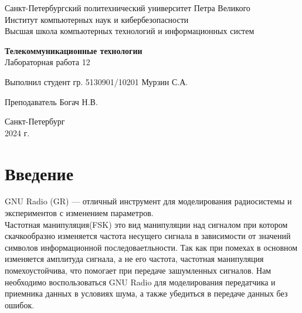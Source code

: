 \documentclass{article}
\begin{document}
\thispagestyle{empty} 
\vspace*{-3cm}
\begin{center}
    Санкт-Петербургский политехнический университет Петра Великого \\
    Институт компьютерных наук и кибербезопасности \\
    Высшая школа компьютерных технологий и информационных систем
\end{center}
\vspace{5cm}
\begin{center}
    \textbf{\Large Телекоммуникационные технологии} \\
    \vspace{0.5cm}
    \Large Лабораторная работа 12 \\
\end{center}
\vspace{3cm}
\begin{flushright}
\noindent Выполнил студент гр. 5130901/10201 \underline{\hspace{3cm}} Мурзин С.А. \\
\end{flushright}
\vspace{1cm}
\begin{flushright}
    \noindent Преподаватель \underline{\hspace{3cm}} Богач Н.В.
\end{flushright}
\vspace{8cm}
\begin{center}
    Санкт-Петербург \\
    2024 г.
\end{center}
\newpage




\newpage
\tableofcontents
\newpage




\newpage
\section{Введение}
GNU Radio (GR) — отличный инструмент для моделирования радиосистемы и экспериментов с изменением параметров. \\
Частотная манипуляция(FSK) это вид манипуляции над сигналом при котором скачкообразно изменяется частота несущего сигнала в зависимости от значений символов информационной последоваетльности. Так как при помехах в основном изменяется амплитуда сигнала, а не его частота, частотная манипуляция помехоустойчива, что помогает при передаче зашумленных сигналов. Нам необходимо воспользоваться GNU Radio для моделирования передатчика и приемника данных в условиях шума, а также убедиться в передаче данных без ошибок.
\newpage
\end{document}
